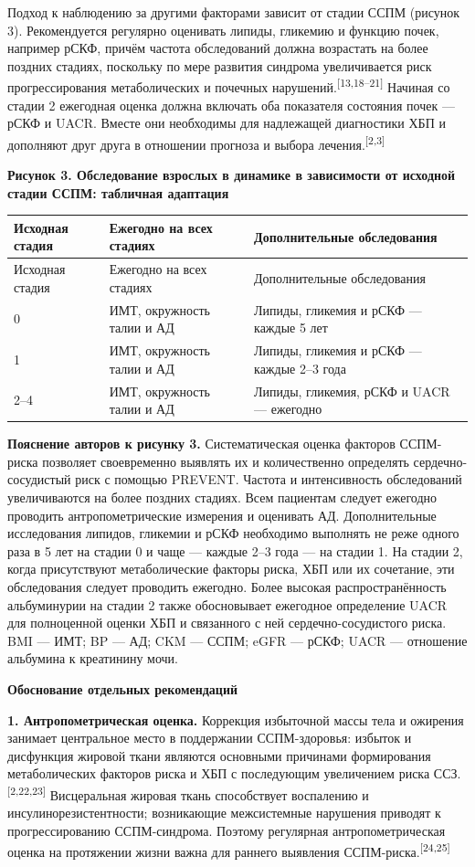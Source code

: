 \documentclass[11pt,a4paper]{article}
\newcommand{\src}[1]{\textsuperscript{[#1]}}
\newcommand{\heading}[1]{\par\medskip\textbf{#1}\par}
\begin{document}
Подход к наблюдению за другими факторами зависит от стадии ССПМ (рисунок 3). Рекомендуется регулярно оценивать липиды, гликемию и функцию почек, например рСКФ, причём частота обследований должна возрастать на более поздних стадиях, поскольку по мере развития синдрома увеличивается риск прогрессирования метаболических и почечных нарушений.\src{13,18--21} Начиная со стадии 2 ежегодная оценка должна включать оба показателя состояния почек --- рСКФ и UACR. Вместе они необходимы для надлежащей диагностики ХБП и дополняют друг друга в отношении прогноза и выбора лечения.\src{2,3}

\heading{Рисунок 3. Обследование взрослых в динамике в зависимости от исходной стадии ССПМ: табличная адаптация}
{\small
\begin{longtable}{P{0.16\textwidth}P{0.33\textwidth}P{0.44\textwidth}}
\toprule Исходная стадия & Ежегодно на всех стадиях & Дополнительные обследования\\\midrule
\endfirsthead
\toprule Исходная стадия & Ежегодно на всех стадиях & Дополнительные обследования\\\midrule
{} & ИМТ, окружность талии и АД & Липиды, гликемия и рСКФ --- каждые 5 лет\\
1 & ИМТ, окружность талии и АД & Липиды, гликемия и рСКФ --- каждые 2--3 года\\
2--4 & ИМТ, окружность талии и АД & Липиды, гликемия, рСКФ и UACR --- ежегодно\\
\bottomrule
\end{longtable}
}
\textbf{Пояснение авторов к рисунку 3.} Систематическая оценка факторов ССПМ-риска позволяет своевременно выявлять их и количественно определять сердечно-сосудистый риск с помощью PREVENT. Частота и интенсивность обследований увеличиваются на более поздних стадиях. Всем пациентам следует ежегодно проводить антропометрические измерения и оценивать АД. Дополнительные исследования липидов, гликемии и рСКФ необходимо выполнять не реже одного раза в 5 лет на стадии 0 и чаще --- каждые 2--3 года --- на стадии 1. На стадии 2, когда присутствуют метаболические факторы риска, ХБП или их сочетание, эти обследования следует проводить ежегодно. Более высокая распространённость альбуминурии на стадии 2 также обосновывает ежегодное определение UACR для полноценной оценки ХБП и связанного с ней сердечно-сосудистого риска. BMI --- ИМТ; BP --- АД; CKM --- ССПМ; eGFR --- рСКФ; UACR --- отношение альбумина к креатинину мочи.

\heading{Обоснование отдельных рекомендаций}
\textbf{1. Антропометрическая оценка.} Коррекция избыточной массы тела и ожирения занимает центральное место в поддержании ССПМ-здоровья: избыток и дисфункция жировой ткани являются основными причинами формирования метаболических факторов риска и ХБП с последующим увеличением риска ССЗ.\src{2,22,23} Висцеральная жировая ткань способствует воспалению и инсулинорезистентности; возникающие межсистемные нарушения приводят к прогрессированию ССПМ-синдрома. Поэтому регулярная антропометрическая оценка на протяжении жизни важна для раннего выявления ССПМ-риска.\src{24,25}
\end{document}
